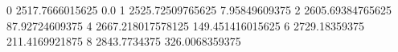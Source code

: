 0 2517.7666015625 0.0
1 2525.72509765625 7.95849609375
2 2605.69384765625 87.92724609375
4 2667.218017578125 149.451416015625
6 2729.18359375 211.4169921875
8 2843.7734375 326.0068359375
